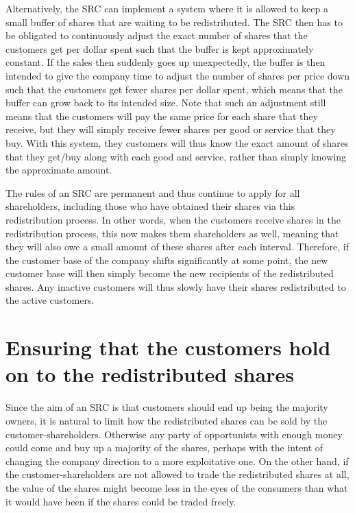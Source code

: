 \documentclass{article}
\begin{document}
Alternatively, the SRC can implement a system where it is allowed to keep a small buffer of shares that are waiting to be redistributed. The SRC then has to be obligated to continuously adjust the exact number of shares that the customers get per dollar spent such that the buffer is kept approximately constant. If the sales then suddenly goes up unexpectedly, the buffer is then intended to give the company time to adjust the number of shares per price down such that the customers get fewer shares per dollar spent, which means that the buffer can grow back to its intended size. Note that such an adjustment still means that the customers will pay the same price for each share that they receive, but they will simply receive fewer shares per good or service that they buy. With this system, they customers will thus know the exact amount of shares that they get/buy along with each good and service, rather than simply knowing the approximate amount. 



The rules of an SRC are permanent and thus continue to apply for all shareholders, including those who have obtained their shares via this redistribution process. In other words, when the customers receive shares in the redistribution process, this now makes them shareholders as well, meaning that they will also owe a small amount of these shares after each interval. 
Therefore, if the customer base of the company shifts significantly at some point, the new customer base will then simply become the new recipients of the redistributed shares. Any inactive customers will thus slowly have their shares redistributed to the active customers.



\section{Ensuring that the customers hold on to the redistributed shares}


Since the aim of an SRC is that customers should end up being the majority owners, it is natural to limit how the redistributed shares can be sold by the customer-shareholders. Otherwise any party of opportunists with enough money could come and buy up a majority of the shares, perhaps with the intent of changing the company direction to a more exploitative one. On the other hand, if the customer-shareholders are not allowed to trade the redistributed shares at all, the value of the shares might become less in the eyes of the consumers than what it would have been if the shares could be traded freely. 
\end{document}
